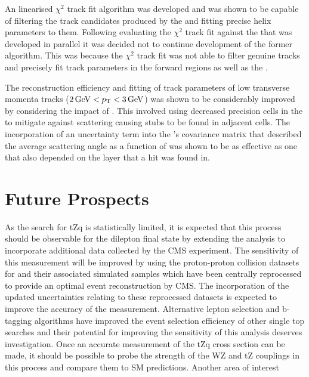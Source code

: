 An linearised $\chi^{2}$ track fit algorithm was developed and was shown to be capable of filtering the track candidates produced by the \HT and fitting precise helix parameters to them.
Following evaluating the $\chi^{2}$ track fit against the \KF that was developed in parallel it was decided not to continue development of the former algorithm.
This was because the $\chi^{2}$ track fit was not able to filter genuine tracks and precisely fit track parameters in the forward regions as well as the \KF.

The reconstruction efficiency and fitting of track parameters of low transverse momenta tracks ($2\,\text{Ge\hspace{-.08em}V} < p_{\mathrm{T}} < 3\,\text{Ge\hspace{-.08em}V}$) was shown to be considerably improved by considering the impact of \MS.
This involved using decreased precision cells in the \HT to mitigate against scattering causing stubs to be found in adjacent \HT cells.
The incorporation of an uncertainty term into the \KF's covariance matrix that described the average scattering angle as a function of \pT was shown to be as effective as one that also depended on the layer that a hit was found in.


\section{Future Prospects}
As the search for tZq is statistically limited, it is expected that this process should be observable for the dilepton final state by extending the analysis to incorporate additional data collected by the CMS experiment.
The sensitivity of this measurement will be improved by using the proton-proton collision datasets for and their associated simulated samples which have been centrally reprocessed to provide an optimal event reconstruction by CMS.
The incorporation of the updated uncertainties relating to these reprocessed datasets is  expected to improve the accuracy of the measurement.
Alternative lepton selection and b-tagging algorithms have improved the event selection efficiency of other single top searches and their potential for improving the sensitivity of this analysis deserves investigation.
Once an accurate measurement of the tZq cross section can be made, it should be possible to probe  the strength of the WZ and tZ couplings in this process and compare them to SM predictions.
Another area of interest

